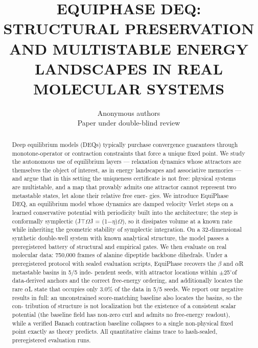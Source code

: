 \documentclass{article}
\title{EQUIPHASE DEQ: STRUCTURAL PRESERVATION AND MULTISTABLE ENERGY LANDSCAPES IN REAL MOLECULAR SYSTEMS}
\author{Anonymous authors\\Paper under double-blind review}
\date{}
\begin{document}

\maketitle
\begin{abstract}
Deep equilibrium models (DEQs) typically purchase convergence guarantees
through monotone-operator or contraction constraints that force a unique fixed
point. We study the autonomous use of equilibrium layers --- relaxation dynamics
whose attractors are themselves the object of interest, as in energy landscapes and
associative memories --- and argue that in this setting the uniqueness certificate
is not free: physical systems are multistable, and a map that provably admits one
attractor cannot represent two metastable states, let alone their relative free ener-
gies. We introduce EquiPhase DEQ, an equilibrium model whose dynamics are
damped velocity Verlet steps on a learned conservative potential with periodicity
built into the architecture; the step is conformally symplectic (J$\top$$\Omega$J = (1$-$$\eta$)$\Omega$),
so it dissipates volume at a known rate while inheriting the geometric stability of
symplectic integration. On a 32-dimensional synthetic double-well system with
known analytical structure, the model passes a preregistered battery of structural
and empirical gates. We then evaluate on real molecular data: 750,000 frames of
alanine dipeptide backbone dihedrals. Under a preregistered protocol with sealed
evaluation scripts, EquiPhase recovers the $\beta$ and $\alpha$R metastable basins in 5/5 inde-
pendent seeds, with attractor locations within $\pm$25$^\circ$of data-derived anchors and
the correct free-energy ordering, and additionally locates the rare $\alpha$L state that
occupies only 3.0\% of the data in 5/5 seeds. We report our negative results in
full: an unconstrained score-matching baseline also locates the basins, so the con-
tribution of structure is not localization but the existence of a consistent scalar
potential (the baseline field has non-zero curl and admits no free-energy readout),
while a verified Banach contraction baseline collapses to a single non-physical
fixed point exactly as theory predicts. All quantitative claims trace to hash-sealed,
preregistered evaluation runs.
\end{abstract}
\end{document}
